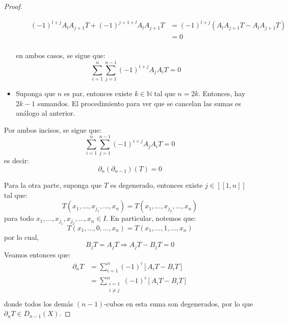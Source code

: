 \documentclass[12pt]{report}
\newcounter{it}
\theoremstyle{largebreak}
\newcommand\natint[1]{\ensuremath{\left[\!\left[ #1\right]\!\right]}}
\begin{document}
\begin{proof}
\begin{itemize}
\begin{itemize}
\begin{equation*}
                    \begin{split}
                        (-1)^{l+j }A_lA_{ j+1}T+(-1)^{j+1+l}A_lA_{ j+1}T&=(-1)^{l+j }(A_lA_{ j+1}T-A_lA_{ j+1}T)\\
                        &=0\\
                    \end{split}
                \end{equation*}
            \end{itemize}
            en ambos casos, se sigue que:
            \begin{equation*}
                \sum_{ i=1}^n \sum_{ j=1}^{n-1}(-1)^{i+j}A_jA_iT=0
            \end{equation*}
            \item Suponga que $n$ es par, entonces existe $k\in\mathbb{N}$ tal que $n=2k$. Entonces, hay $2k-1$ sumandos. El procedimiento para ver que se cancelan las sumas es análogo al anterior.
        \end{itemize}
        Por ambos incisos, se sigue que:
        \begin{equation*}
            \sum_{ i=1}^n \sum_{ j=1}^{n-1}(-1)^{i+j}A_jA_iT=0
        \end{equation*}
        es decir:
        \begin{equation*}
            \partial_n(\partial_{ n-1})(T)=0
        \end{equation*}

        Para la otra parte, suponga que $T$ es degenerado, entonces existe $j\in\natint{1,n}$ tal que:
        \begin{equation*}
            T(x_1,...,x_{j_1},...,x_n)=T(x_1,...,x_{j_2},...,x_n)
        \end{equation*}
        para todo $x_1,...,x_{j_1},x_{j_2},...,x_n\in I$. En particular, notemos que:
        \begin{equation*}
            T(x_1,...,0,...,x_n)=T(x_1,...,1,...,x_n)
        \end{equation*}
        por lo cual,
        \begin{equation*}
            B_jT=A_jT\Rightarrow A_jT-B_jT=0
        \end{equation*}
        Veamos entonces que:
        \begin{equation*}
            \begin{split}
                \partial_nT&=\sum_{ i=1}^n (-1)^i\left[A_iT-B_iT \right]\\
                &=\sum^n_{\substack{i=1 \\ i \neq j}} (-1)^i\left[A_iT-B_iT \right]\\
            \end{split}
        \end{equation*}
        donde todos los demás $(n-1)$-cubos en esta suma son degenerados, por lo que $\partial_nT\in D_{n-1}(X)$.
    \end{proof}
\end{document}
